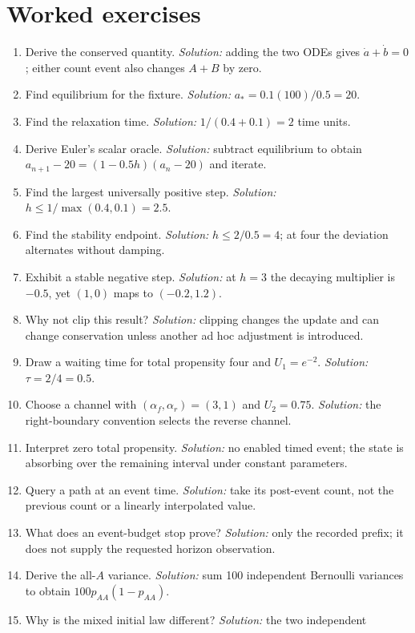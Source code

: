 \section{Worked exercises}
\begin{enumerate}
\setlength{\itemsep}{1pt}
\item Derive the conserved quantity. \emph{Solution:} adding the two ODEs gives
$\dot a+\dot b=0$; either count event also changes $A+B$ by zero.
\item Find equilibrium for the fixture. \emph{Solution:} $a_*=0.1(100)/0.5=20$.
\item Find the relaxation time. \emph{Solution:} $1/(0.4+0.1)=2$ time units.
\item Derive Euler's scalar oracle. \emph{Solution:} subtract equilibrium to obtain
$a_{n+1}-20=(1-0.5h)(a_n-20)$ and iterate.
\item Find the largest universally positive step. \emph{Solution:}
$h\le1/\max(0.4,0.1)=2.5$.
\item Find the stability endpoint. \emph{Solution:} $h\le2/0.5=4$;
at four the deviation alternates without damping.
\item Exhibit a stable negative step. \emph{Solution:} at $h=3$ the decaying
multiplier is $-0.5$, yet $(1,0)$ maps to $(-0.2,1.2)$.
\item Why not clip this result? \emph{Solution:} clipping changes the update and
can change conservation unless another ad hoc adjustment is introduced.
\item Draw a waiting time for total propensity four and $U_1=e^{-2}$.
\emph{Solution:} $\tau=2/4=0.5$.
\item Choose a channel with $(\alpha_f,\alpha_r)=(3,1)$ and $U_2=0.75$.
\emph{Solution:} the right-boundary convention selects the reverse channel.
\item Interpret zero total propensity. \emph{Solution:} no enabled timed event;
the state is absorbing over the remaining interval under constant parameters.
\item Query a path at an event time. \emph{Solution:} take its post-event count,
not the previous count or a linearly interpolated value.
\item What does an event-budget stop prove? \emph{Solution:} only the recorded
prefix; it does not supply the requested horizon observation.
\item Derive the all-$A$ variance. \emph{Solution:} sum 100 independent Bernoulli
variances to obtain $100p_{AA}(1-p_{AA})$.
\item Why is the mixed initial law different? \emph{Solution:} the two independent

\end{enumerate}
